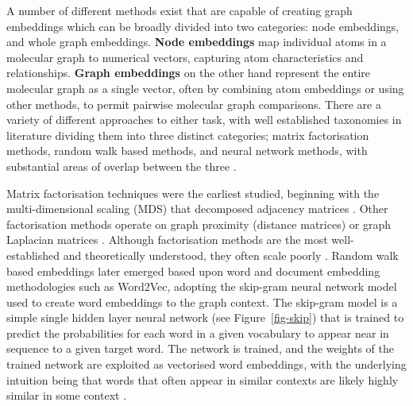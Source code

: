 \documentclass[
  super,
  preprint,
  3p]{elsarticle}
\begin{document}
A number of different methods exist that are capable of creating graph
embeddings which can be broadly divided into two categories: node
embeddings, and whole graph embeddings. \textbf{Node embeddings} map
individual atoms in a molecular graph to numerical vectors, capturing
atom characteristics and relationships. \textbf{Graph embeddings} on the
other hand represent the entire molecular graph as a single vector,
often by combining atom embeddings or using other methods, to permit
pairwise molecular graph comparisons. There are a variety of different
approaches to either task, with well established taxonomies in
literature dividing them into three distinct categories; matrix
factorisation methods, random walk based methods, and neural network
methods, with substantial areas of overlap between the three
\citep{xu_understanding_2021, goyal_graph_2018}.

Matrix factorisation techniques were the earliest studied, beginning
with the multi-dimensional scaling (MDS) that decomposed adjacency
matrices \citep{RN34}. Other factorisation methods operate on graph
proximity (distance matrices) or graph Laplacian matrices
\citep{RN35, RN36}. Although factorisation methods are the most
well-established and theoretically understood, they often scale poorly
\citep{xu_understanding_2020}. Random walk based embeddings
\citep{perozzi_deepwalk_2014} later emerged based upon word and document
embedding methodologies such as Word2Vec, adopting the skip-gram neural
network model used to create word embeddings to the graph context. The
skip-gram model is a simple single hidden layer neural network (see
Figure~\ref{fig-skip}) that is trained to predict the probabilities for
each word in a given vocabulary to appear near in sequence to a given
target word. The network is trained, and the weights of the trained
network are exploited as vectorised word embeddings, with the underlying
intuition being that words that often appear in similar contexts are
likely highly similar in some context \citep{mikolov_efficient_2013}.
\end{document}
